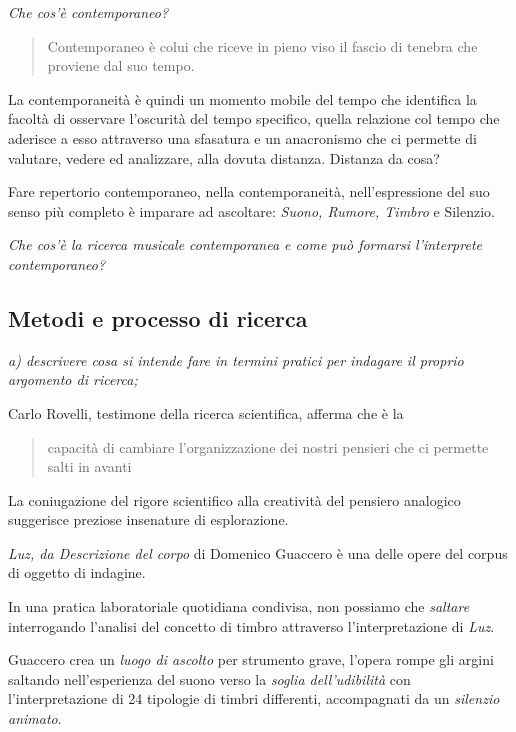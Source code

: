 \documentclass{gs-adonis}
\begin{document}
\emph{Che cos'è contemporaneo?}

\begin{quote}
  Contemporaneo è colui che riceve in pieno viso il fascio di tenebra che proviene dal suo tempo. \cite{agamben2008che}
\end{quote}

La contemporaneità è quindi un momento mobile del tempo che identifica la
facoltà di osservare l’oscurità del tempo specifico, quella relazione col
tempo che aderisce a esso attraverso una sfasatura e un anacronismo che ci
permette di valutare, vedere ed analizzare, alla dovuta distanza. Distanza da
cosa?

Fare repertorio contemporaneo, nella contemporaneità, nell’espressione del suo
senso più completo è imparare ad ascoltare: \emph{Suono, Rumore, Timbro} e Silenzio.

\emph{Che cos'è la ricerca musicale contemporanea e come può formarsi
l'interprete contemporaneo?}

\subsection{Metodi e processo di ricerca}%

\emph{a) descrivere cosa si intende fare in termini pratici per indagare il proprio argomento di ricerca;}

Carlo Rovelli, testimone della ricerca scientifica, afferma che è la

\begin{quote}
  capacità di cambiare l'organizzazione dei nostri pensieri che ci permette
  salti in avanti
\end{quote}

La coniugazione del rigore scientifico alla creatività del pensiero analogico
suggerisce preziose insenature di esplorazione.

\emph{Luz, da Descrizione del corpo} di Domenico Guaccero è una delle opere del
corpus di oggetto di indagine.

In una pratica laboratoriale quotidiana condivisa, non possiamo che
\emph{saltare} interrogando l'analisi del concetto di timbro attraverso
l'interpretazione di \emph{Luz}.

Guaccero crea un \emph{luogo di ascolto} per strumento grave, l'opera rompe
gli argini saltando nell'esperienza del suono verso la
\emph{soglia dell'udibilità} con l'interpretazione di 24 tipologie di timbri
differenti, accompagnati da un \emph{silenzio animato}.
\end{document}
